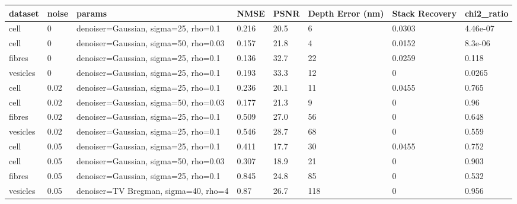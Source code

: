 \begin{center}\begin{minipage}{\linewidth}\centering
{}
\begin{adjustbox}{max width=\linewidth}
\begin{tabular}{llllllll}
\toprule
dataset & noise & params & NMSE & PSNR & Depth Error (nm) & Stack Recovery & chi2\_ratio \\
\midrule
cell & 0 & denoiser=Gaussian, sigma=25, rho=0.1 & 0.216 & 20.5 & 6 & 0.0303 & 4.46e-07 \\
cell & 0 & denoiser=Gaussian, sigma=50, rho=0.03 & 0.157 & 21.8 & 4 & 0.0152 & 8.3e-06 \\
fibres & 0 & denoiser=Gaussian, sigma=25, rho=0.1 & 0.136 & 32.7 & 22 & 0.0259 & 0.118 \\
vesicles & 0 & denoiser=Gaussian, sigma=25, rho=0.1 & 0.193 & 33.3 & 12 & 0 & 0.0265 \\
cell & 0.02 & denoiser=Gaussian, sigma=25, rho=0.1 & 0.236 & 20.1 & 11 & 0.0455 & 0.765 \\
cell & 0.02 & denoiser=Gaussian, sigma=50, rho=0.03 & 0.177 & 21.3 & 9 & 0 & 0.96 \\
fibres & 0.02 & denoiser=Gaussian, sigma=25, rho=0.1 & 0.509 & 27.0 & 56 & 0 & 0.648 \\
vesicles & 0.02 & denoiser=Gaussian, sigma=25, rho=0.1 & 0.546 & 28.7 & 68 & 0 & 0.559 \\
cell & 0.05 & denoiser=Gaussian, sigma=25, rho=0.1 & 0.411 & 17.7 & 30 & 0.0455 & 0.752 \\
cell & 0.05 & denoiser=Gaussian, sigma=50, rho=0.03 & 0.307 & 18.9 & 21 & 0 & 0.903 \\
fibres & 0.05 & denoiser=Gaussian, sigma=25, rho=0.1 & 0.845 & 24.8 & 85 & 0 & 0.532 \\
vesicles & 0.05 & denoiser=TV Bregman, sigma=40, rho=4 & 0.87 & 26.7 & 118 & 0 & 0.956 \\
\bottomrule
\end{tabular}\end{adjustbox}\end{minipage}\end{center}
